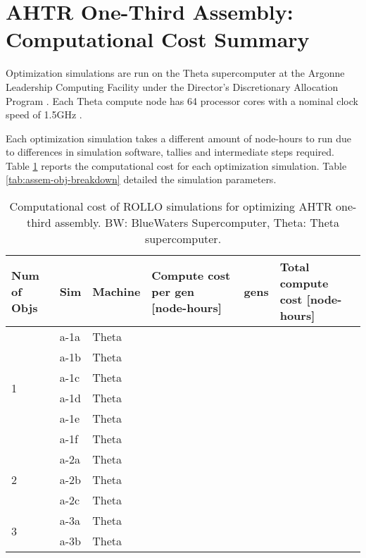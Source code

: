 \pagebreak
\section{AHTR One-Third Assembly: Computational Cost Summary}
\label{sec:assem-compute-cost}
Optimization simulations are run on the Theta supercomputer at the Argonne Leadership 
Computing Facility under the Director's Discretionary Allocation Program 
\cite{noauthor_argonne_2022}. 
Each Theta compute node has 64 processor cores with a nominal clock speed of 
1.5GHz \cite{noauthor_argonne_2022}.  

Each optimization simulation takes a different amount of node-hours to run due to 
differences in simulation software, tallies and intermediate steps required. 
Table \ref{tab:assem-compute-cost} reports the computational cost for each optimization 
simulation. 
Table \ref{tab:assem-obj-breakdown} detailed the simulation parameters.
\begin{table}[htbp!]
    \centering
    \onehalfspacing
    \caption{Computational cost of \acrfull{ROLLO} simulations for optimizing 
    \acrfull{AHTR} one-third assembly. BW: BlueWaters Supercomputer, Theta: Theta 
    supercomputer.}
	\label{tab:assem-compute-cost}
    \footnotesize
    \begin{tabular}{p{1.4cm}|p{1cm}lp{4cm}lp{4cm}}
    \hline 
    \textbf{Num of Objs} & \textbf{Sim} & \textbf{Machine} & 
    \textbf{Compute cost per gen [node-hours]} &\textbf{gens} & 
    \textbf{Total compute cost [node-hours]} \\
    \hline
    \multirow{6}{2cm}{1} 
    & a-1a & Theta &  &  &  \\
    & a-1b & Theta &  &  &  \\
    & a-1c & Theta &  &  &  \\
    & a-1d & Theta &  &  &  \\
    & a-1e & Theta &  &  &  \\
    & a-1f & Theta &  &  &  \\
    \hline
    \multirow{3}{2cm}{2}
    & a-2a & Theta &  &  &  \\
    & a-2b & Theta &  &  &  \\
    & a-2c & Theta &  &  &  \\
    \hline
    \multirow{2}{2cm}{3}
    & a-3a & Theta &  &  &  \\
    & a-3b & Theta &  &  &  \\
    \hline
    \end{tabular}
\end{table}